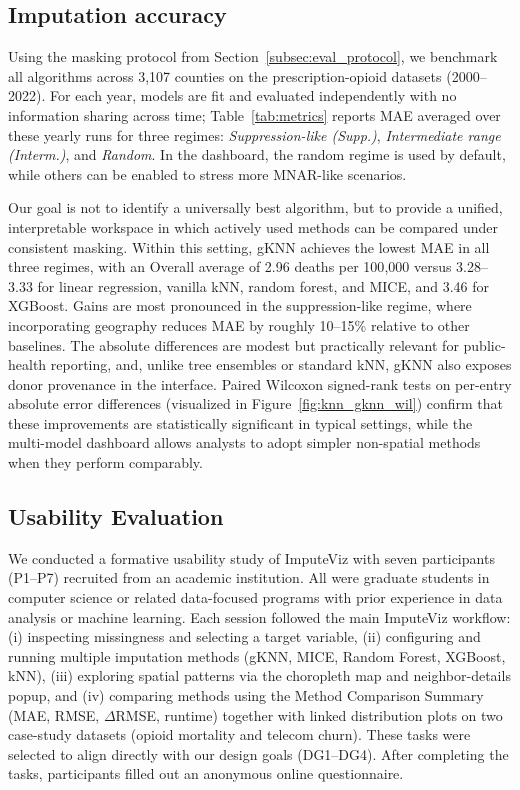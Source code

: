 \documentclass[review]{vgtc}
\newcommand{\gknn}{gKNN\xspace}
\newcommand{\tool}{ImputeViz\xspace}
\begin{document}
\subsection{Imputation accuracy}
\label{subsec:iacc}

Using the masking protocol from Section~\ref{subsec:eval_protocol}, we benchmark all algorithms across 3{,}107 counties on the prescription-opioid datasets (2000--2022). For each year, models are fit and evaluated independently with no information sharing across time; Table~\ref{tab:metrics} reports MAE averaged over these yearly runs for three regimes: \emph{Suppression-like (Supp.)}, \emph{Intermediate range (Interm.)}, and \emph{Random}. In the dashboard, the random regime is used by default, while others can be enabled to stress more MNAR-like scenarios.

Our goal is not to identify a universally best algorithm, but to provide a unified, interpretable workspace in which actively used methods can be compared under consistent masking. Within this setting, \gknn{} achieves the lowest MAE in all three regimes, with an Overall average of 2.96 deaths per 100{,}000 versus 3.28--3.33 for linear regression, vanilla kNN, random forest, and MICE, and 3.46 for XGBoost. Gains are most pronounced in the suppression-like regime, where incorporating geography reduces MAE by roughly 10--15\% relative to other baselines. The absolute differences are modest but practically relevant for public-health reporting, and, unlike tree ensembles or standard kNN, \gknn{} also exposes donor provenance in the interface. Paired Wilcoxon signed-rank tests on per-entry absolute error differences (visualized in Figure~\ref{fig:knn_gknn_wil}) confirm that these improvements are statistically significant in typical settings, while the multi-model dashboard allows analysts to adopt simpler non-spatial methods when they perform comparably.
\vspace{-8pt}

\subsection{Usability Evaluation}
\label{sec:user-study}

We conducted a formative usability study of \tool with seven participants (P1--P7) recruited from an academic institution. All were graduate students in computer science or related data-focused programs with prior experience in data analysis or machine learning. Each session followed the main \tool workflow: (i) inspecting missingness and selecting a target variable, (ii) configuring and running multiple imputation methods (gKNN, MICE, Random Forest, XGBoost, kNN), (iii) exploring spatial patterns via the choropleth map and neighbor-details popup, and (iv) comparing methods using the Method Comparison Summary (MAE, RMSE, $\Delta$RMSE, runtime) together with linked distribution plots on two case-study datasets (opioid mortality and telecom churn). These tasks were selected to align directly with our design goals (DG1--DG4). After completing the tasks, participants filled out an anonymous online questionnaire.
\end{document}

